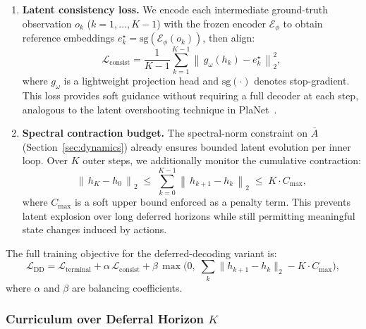 \begin{enumerate}
  \item \textbf{Latent consistency loss.}
    We encode each intermediate ground-truth observation $o_k$ ($k = 1,
    \ldots, K-1$) with the frozen encoder $\mathcal{E}_\phi$ to obtain
    reference embeddings $e_k^{\star} = \mathrm{sg}(\mathcal{E}_\phi(o_k))$,
    then align:
    \begin{equation}
      \mathcal{L}_{\mathrm{consist}} =
        \frac{1}{K-1}\sum_{k=1}^{K-1}
          \left\|\, g_\omega(h_k) - e_k^{\star}\,\right\|_2^2,
      \label{eq:dd_consist}
    \end{equation}
    where $g_\omega$ is a lightweight projection head and $\mathrm{sg}(\cdot)$
    denotes stop-gradient.  This loss provides soft guidance without
    requiring a full decoder at each step, analogous to the latent
    overshooting technique in PlaNet~\citep{hafner2019planet}.

  \item \textbf{Spectral contraction budget.}
    The spectral-norm constraint on $\bar{A}$ (Section~\ref{sec:dynamics})
    already ensures bounded latent evolution per inner loop.  Over $K$ outer
    steps, we additionally monitor the cumulative contraction:
    \begin{equation}
      \left\|\, h_K - h_0 \,\right\|_2
        \;\leq\; \sum_{k=0}^{K-1} \left\|\, h_{k+1} - h_k \,\right\|_2
        \;\leq\; K \cdot C_{\max},
      \label{eq:dd_contraction}
    \end{equation}
    where $C_{\max}$ is a soft upper bound enforced as a penalty term.
    This prevents latent explosion over long deferred horizons while still
    permitting meaningful state changes induced by actions.
\end{enumerate}

The full training objective for the deferred-decoding variant is:
\begin{equation}
  \mathcal{L}_{\mathrm{DD}} =
    \mathcal{L}_{\mathrm{terminal}}
    + \alpha\,\mathcal{L}_{\mathrm{consist}}
    + \beta\,\max\!\bigl(0,\;\textstyle\sum_{k}\|h_{k+1}-h_k\|_2 - K\cdot C_{\max}\bigr),
  \label{eq:dd_total}
\end{equation}
where $\alpha$ and $\beta$ are balancing coefficients.

\subsubsection{Curriculum over Deferral Horizon $K$}
\label{sec:dd_curriculum}


